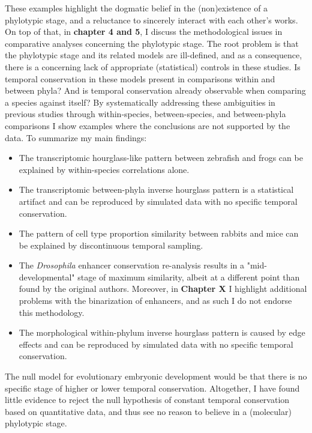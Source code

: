 These examples highlight the dogmatic belief in the (non)existence of a phylotypic stage, and a reluctance to sincerely interact with each other's works. On top of that, in \textbf{chapter 4 and 5}, I discuss the methodological issues in comparative analyses concerning the phylotypic stage. The root problem is that the phylotypic stage and its related models are ill-defined, and as a consequence, there is a concerning lack of appropriate (statistical) controls in these studies. Is temporal conservation in these models present in comparisons within and between phyla? And is temporal conservation already observable when comparing a species against itself? By systematically addressing these ambiguities in previous studies through within-species, between-species, and between-phyla comparisons I show examples where the conclusions are not supported by the data. To summarize my main findings:
\begin{itemize}
    \item The transcriptomic hourglass-like pattern between zebrafish and frogs\cite{marletaz2018} can be explained by within-species correlations alone.
    \item The transcriptomic between-phyla inverse hourglass pattern\cite{Levin2016} is a statistical artifact and can be reproduced by simulated data with no specific temporal conservation.
    \item The pattern of cell type proportion similarity between rabbits and mice\cite{Mayshar2023} can be explained by discontinuous temporal sampling.
    \item The \textit{Drosophila} enhancer conservation re-analysis results in a "mid-developmental" stage of maximum similarity, albeit at a different point than found by the original authors. Moreover, in \textbf{Chapter X} I highlight additional problems with the binarization of enhancers, and as such I do not endorse this methodology.
    \item  The morphological within-phylum inverse hourglass pattern is caused by edge effects and can be reproduced by simulated data with no specific temporal conservation.
\end{itemize}
\noindent
The null model for evolutionary embryonic development would be that there is no specific stage of higher or lower temporal conservation. Altogether, I have found little evidence to reject the null hypothesis of constant temporal conservation based on quantitative data, and thus see no reason to believe in a (molecular) phylotypic stage.

